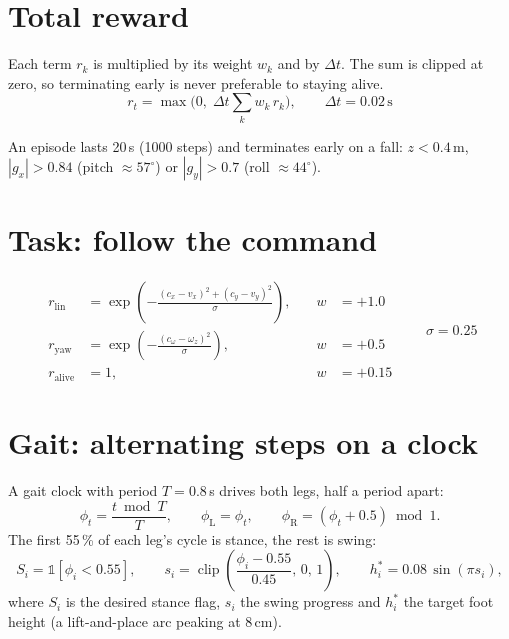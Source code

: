 \documentclass[11pt]{article}
\newcommand{\ind}{\mathbb{1}}
\begin{document}
\section*{Total reward}

Each term $r_k$ is multiplied by its weight $w_k$ and by $\Delta t$. The sum is
clipped at zero, so terminating early is never preferable to staying alive.
\begin{equation}
r_t = \max\!\Big(0,\; \Delta t \sum_k w_k\, r_k\Big), \qquad \Delta t = 0.02\,\mathrm{s}
\end{equation}

An episode lasts 20\,s (1000 steps) and terminates early on a fall:
$z < 0.4$\,m, $|g_x| > 0.84$ (pitch $\approx 57^\circ$) or
$|g_y| > 0.7$ (roll $\approx 44^\circ$).

\section{Task: follow the command}

\begin{equation}
\begin{aligned}
r_{\mathrm{lin}} &= \exp\!\left(-\frac{(c_x - v_x)^2 + (c_y - v_y)^2}{\sigma}\right),
&\quad w &= +1.0 \\
r_{\mathrm{yaw}} &= \exp\!\left(-\frac{(c_\omega - \omega_z)^2}{\sigma}\right),
&\quad w &= +0.5 \\
r_{\mathrm{alive}} &= 1,
&\quad w &= +0.15
\end{aligned}
\qquad \sigma = 0.25
\end{equation}

\section{Gait: alternating steps on a clock}
\label{sec:gait}

A gait clock with period $T = 0.8$\,s drives both legs, half a period apart:
\begin{equation}
\phi_t = \frac{t \bmod T}{T}, \qquad
\phi_{\mathrm{L}} = \phi_t, \qquad
\phi_{\mathrm{R}} = (\phi_t + 0.5) \bmod 1 .
\end{equation}
The first 55\,\% of each leg's cycle is stance, the rest is swing:
\begin{equation}
S_i = \ind[\phi_i < 0.55], \qquad
s_i = \operatorname{clip}\!\left(\frac{\phi_i - 0.55}{0.45},\, 0,\, 1\right), \qquad
h^{*}_i = 0.08\,\sin(\pi s_i),
\end{equation}
where $S_i$ is the desired stance flag, $s_i$ the swing progress and $h^{*}_i$
the target foot height (a lift-and-place arc peaking at 8\,cm).
\end{document}
